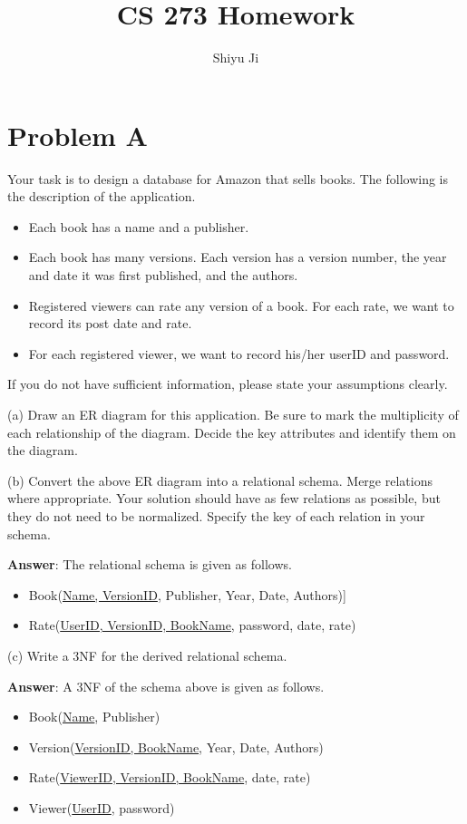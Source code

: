 \documentclass{article}
\begin{document}
\title{\bf CS 273 Homework}
\author{Shiyu Ji}
\date{}
\maketitle

\section{Problem A}
Your task is to design a database for Amazon that sells books.
The following is the description of the application.
\begin{itemize}
\item Each book has a name and a publisher.
\item Each book has many versions. Each version has a version number, the year and date it was first published, and the authors.
\item Registered viewers can rate any version of a book. For each rate, we want to record its post date and rate.
\item For each registered viewer, we want to record his/her userID and password.
\end{itemize}
If you do not have sufficient information, please state your assumptions clearly.

(a) Draw an ER diagram for this application. Be sure to mark the multiplicity of each relationship of the diagram. Decide the key attributes and identify them on the diagram.

(b) Convert the above ER diagram into a relational schema. Merge relations where appropriate. Your solution should have as few relations as possible, but they do not need to be normalized. Specify the key of each relation in your schema.

{\bf Answer}: The relational schema is given as follows.
\begin{itemize}
\item Book(\underline{Name, VersionID}, Publisher, Year, Date, Authors)]
\item Rate(\underline{UserID, VersionID, BookName}, password, date, rate)
\end{itemize}

(c) Write a 3NF for the derived relational schema.

{\bf Answer}: A 3NF of the schema above is given as follows.
\begin{itemize}
\item Book(\underline{Name}, Publisher)
\item Version(\underline{VersionID, BookName}, Year, Date, Authors)
\item Rate(\underline{ViewerID, VersionID, BookName}, date, rate)
\item Viewer(\underline{UserID}, password)
\end{itemize}
\end{document}
